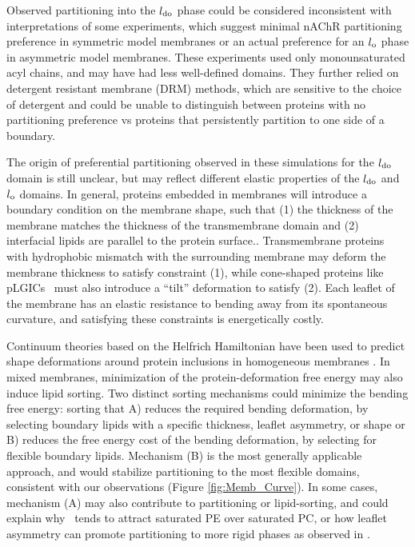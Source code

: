 Observed partitioning into the $l_{\mathrm{do}}$ phase could be considered inconsistent with interpretations of some experiments, \citep{Bermdez_Partition_2010,Perillo2016} which suggest minimal nAChR partitioning preference in symmetric model membranes or an actual preference for an $l_{\mathrm{o}}$ phase in asymmetric model membranes.  These experiments used only monounsaturated acyl chains, and may have had less well-defined domains.  They further relied on detergent resistant membrane (DRM) methods, which are sensitive to {the} choice of detergent \citep{Brown2007} and could be unable to distinguish between proteins with no partitioning preference vs proteins that persistently partition to one side of a boundary. 

The origin of preferential partitioning observed in these simulations for the $l_{\mathrm{do}}$ domain is still unclear, but may reflect different elastic properties of the $l_{\mathrm{do}}$ and $l_{\mathrm{o}}$ domains.  In general, proteins embedded in membranes will introduce a boundary condition on the membrane shape, such that (1) the thickness of the membrane matches the thickness of the transmembrane domain\citep{Aranda-Espinoza1996, Jensen2004, Brannigan2005a} and (2) interfacial lipids are parallel to the protein surface.\citep{Goulian1993}.  Transmembrane proteins with hydrophobic mismatch with the surrounding membrane may deform the membrane thickness to satisfy constraint (1), while cone-shaped proteins like pLGICs~ must also introduce a ``tilt'' deformation to satisfy (2).  Each leaflet of the membrane has an elastic resistance to bending away from its spontaneous curvature, and satisfying these constraints is energetically costly.  

Continuum theories based on the Helfrich Hamiltonian have been used to predict shape deformations around protein inclusions in homogeneous membranes \citep{Goulian1993,Aranda-Espinoza1996,Brannigan_A_2006}.  In mixed membranes, minimization of the protein-deformation free energy may also induce lipid sorting.  Two distinct sorting mechanisms could minimize the bending free energy: sorting that A) reduces the required bending deformation, by selecting boundary lipids with a specific thickness, leaflet asymmetry, or shape or B) reduces the free energy cost of the bending deformation, by selecting for flexible boundary lipids.   Mechanism (B) is the most generally applicable approach, and would stabilize partitioning to the most flexible domains, consistent with our observations (Figure \ref{fig:Memb_Curve}).  In some cases, mechanism (A) may also contribute to partitioning or lipid-sorting, and could explain why \nachr~tends to attract saturated PE over saturated PC, or how leaflet asymmetry can promote partitioning to more rigid phases as observed in \citep{Perillo2016} . 

